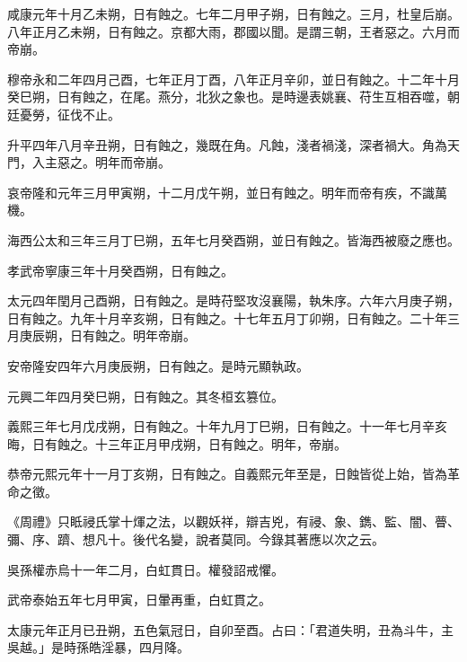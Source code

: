 \begin{pinyinscope}
 咸康元年十月乙未朔，日有蝕之。七年二月甲子朔，日有蝕之。三月，杜皇后崩。
 八年正月乙未朔，日有蝕之。京都大雨，郡國以聞。是謂三朝，王者惡之。六月而帝崩。



 穆帝永和二年四月己酉，七年正月丁酉，八年正月辛卯，並日有蝕之。十二年十月癸巳朔，日有蝕之，在尾。燕分，北狄之象也。是時邊表姚襄、苻生互相吞噬，朝廷憂勞，征伐不止。



 升平四年八月辛丑朔，日有蝕之，幾既在角。凡蝕，淺者禍淺，深者禍大。角為天門，入主惡之。明年而帝崩。



 哀帝隆和元年三月甲寅朔，十二月戊午朔，並日有蝕之。明年而帝有疾，不識萬機。



 海西公太和三年三月丁巳朔，五年七月癸酉朔，並日有蝕之。皆海西被廢之應也。



 孝武帝寧康三年十月癸酉朔，日有蝕之。



 太元四年閏月己酉朔，日有蝕之。是時苻堅攻沒襄陽，執朱序。六年六月庚子朔，日有蝕之。九年十月辛亥朔，日有蝕之。十七年五月丁卯朔，日有蝕之。二十年三月庚辰朔，日有蝕之。明年帝崩。



 安帝隆安四年六月庚辰朔，日有蝕之。是時元顯執政。



 元興二年四月癸巳朔，日有蝕之。其冬桓玄篡位。



 義熙三年七月戊戌朔，日有蝕之。十年九月丁巳朔，日有蝕之。十一年七月辛亥晦，日有蝕之。十三年正月甲戌朔，日有蝕之。明年，帝崩。



 恭帝元熙元年十一月丁亥朔，日有蝕之。自義熙元年至是，日蝕皆從上始，皆為革命之徵。



 《周禮》只眡祲氏掌十煇之法，以觀妖祥，辯吉兇，有祲、象、鐫、監、闇、瞢、彌、序、躋、想凡十。後代名變，說者莫同。今錄其著應以次之云。



 吳孫權赤烏十一年二月，白虹貫日。權發詔戒懼。



 武帝泰始五年七月甲寅，日暈再重，白虹貫之。



 太康元年正月已丑朔，五色氣冠日，自卯至酉。占曰：「君道失明，丑為斗牛，主吳越。」是時孫皓淫暴，四月降。




\end{pinyinscope}
